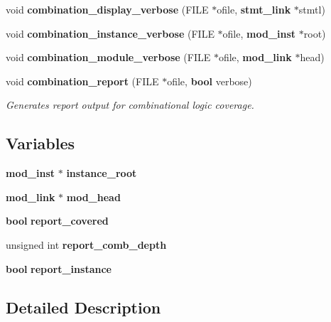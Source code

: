 \begin{CompactItemize}
void {\bf combination\_\-display\_\-verbose} (FILE $\ast$ofile, {\bf stmt\_\-link} $\ast$stmtl)
\item 
void {\bf combination\_\-instance\_\-verbose} (FILE $\ast$ofile, {\bf mod\_\-inst} $\ast$root)
\item 
void {\bf combination\_\-module\_\-verbose} (FILE $\ast$ofile, {\bf mod\_\-link} $\ast$head)
\item 
void {\bf combination\_\-report} (FILE $\ast$ofile, {\bf bool} verbose)
\begin{CompactList}\small\item\em Generates report output for combinational logic coverage.\item\end{CompactList}\end{CompactItemize}
\subsection*{Variables}
\begin{CompactItemize}
\item 
{\bf mod\_\-inst} $\ast$ {\bf instance\_\-root}
\item 
{\bf mod\_\-link} $\ast$ {\bf mod\_\-head}
\item 
{\bf bool} {\bf report\_\-covered}
\item 
unsigned int {\bf report\_\-comb\_\-depth}
\item 
{\bf bool} {\bf report\_\-instance}
\end{CompactItemize}


\subsection{Detailed Description}


